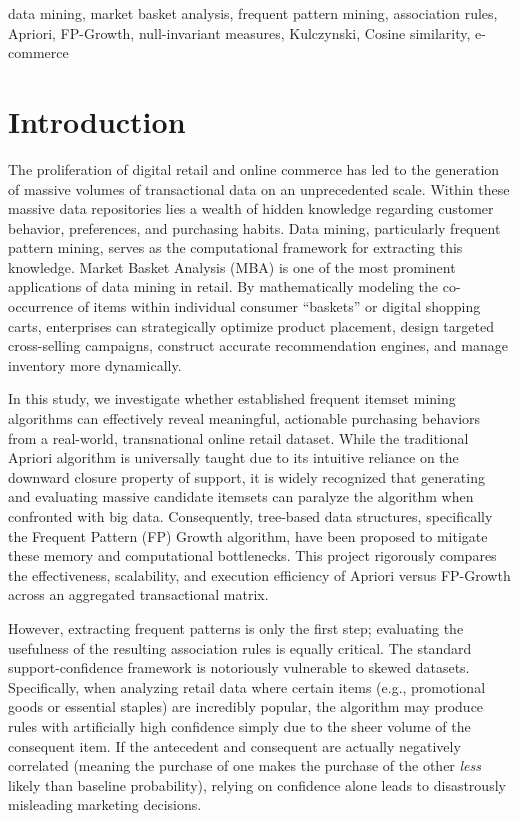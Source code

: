 \documentclass[conference]{IEEEtran}
\begin{document}
\begin{IEEEkeywords}
data mining, market basket analysis, frequent pattern mining, association rules, Apriori, FP-Growth, null-invariant measures, Kulczynski, Cosine similarity, e-commerce
\end{IEEEkeywords}

\section{Introduction}
The proliferation of digital retail and online commerce has led to the generation of massive volumes of transactional data on an unprecedented scale. Within these massive data repositories lies a wealth of hidden knowledge regarding customer behavior, preferences, and purchasing habits. Data mining, particularly frequent pattern mining, serves as the computational framework for extracting this knowledge. Market Basket Analysis (MBA) is one of the most prominent applications of data mining in retail. By mathematically modeling the co-occurrence of items within individual consumer ``baskets'' or digital shopping carts, enterprises can strategically optimize product placement, design targeted cross-selling campaigns, construct accurate recommendation engines, and manage inventory more dynamically.

In this study, we investigate whether established frequent itemset mining algorithms can effectively reveal meaningful, actionable purchasing behaviors from a real-world, transnational online retail dataset. While the traditional Apriori algorithm is universally taught due to its intuitive reliance on the downward closure property of support, it is widely recognized that generating and evaluating massive candidate itemsets can paralyze the algorithm when confronted with big data. Consequently, tree-based data structures, specifically the Frequent Pattern (FP) Growth algorithm, have been proposed to mitigate these memory and computational bottlenecks. This project rigorously compares the effectiveness, scalability, and execution efficiency of Apriori versus FP-Growth across an aggregated transactional matrix.

However, extracting frequent patterns is only the first step; evaluating the usefulness of the resulting association rules is equally critical. The standard support-confidence framework is notoriously vulnerable to skewed datasets. Specifically, when analyzing retail data where certain items (e.g., promotional goods or essential staples) are incredibly popular, the algorithm may produce rules with artificially high confidence simply due to the sheer volume of the consequent item. If the antecedent and consequent are actually negatively correlated (meaning the purchase of one makes the purchase of the other \textit{less} likely than baseline probability), relying on confidence alone leads to disastrously misleading marketing decisions.
\end{document}
